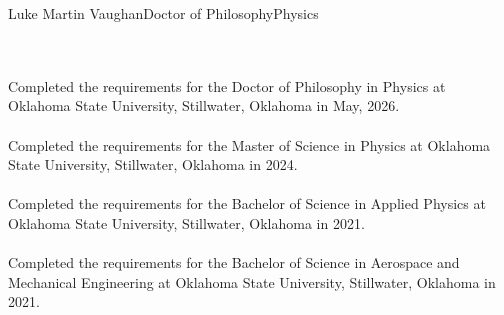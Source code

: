 \newpage
 \begin{vita}{Luke Martin Vaughan}{Doctor of Philosophy}{Physics} %

  \\
 \\
Completed the requirements for the Doctor of Philosophy in Physics at Oklahoma State University, Stillwater, Oklahoma in May, 2026.\\
\\
Completed the requirements for the Master of Science in Physics at Oklahoma State University, Stillwater, Oklahoma in 2024.\\
\\
Completed the requirements for the Bachelor of Science in Applied Physics at Oklahoma State University, Stillwater, Oklahoma in 2021.\\
\\
Completed the requirements for the Bachelor of Science in Aerospace and Mechanical Engineering at Oklahoma State University, Stillwater, Oklahoma in 2021.\\


 \end{vita}
